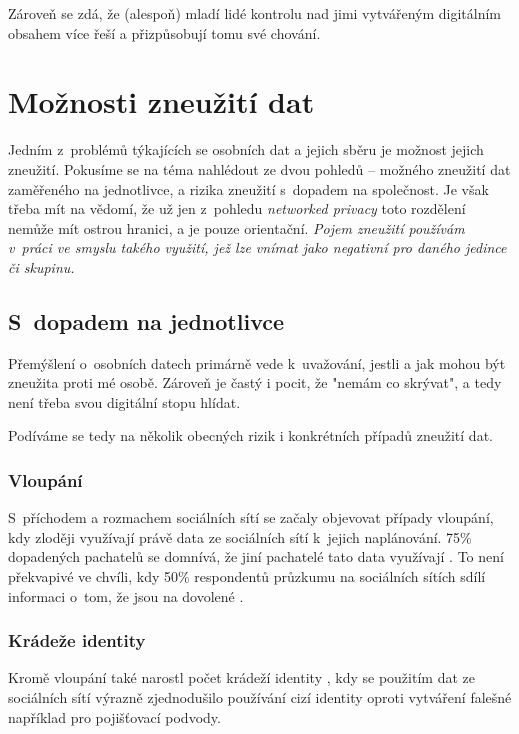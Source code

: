 Zároveň se zdá, že (alespoň) mladí lidé kontrolu nad jimi vytvářeným digitálním obsahem více řeší a přizpůsobují tomu své chování\citep{youth-online-behavior}.

\section{Možnosti zneužití dat}
Jedním z~problémů týkajících se osobních dat a jejich sběru je možnost jejich zneužití. Pokusíme se na téma nahlédout ze dvou pohledů -- možného zneužití dat zaměřeného na jednotlivce, a rizika zneužití s~dopadem na společnost. Je však třeba mít na vědomí, že už jen z~pohledu \textit{networked privacy} toto rozdělení nemůže mít ostrou hranici, a je pouze orientační.
\textit{Pojem zneužití používám v~práci ve smyslu takého využití, jež lze vnímat jako negativní pro daného jedince či skupinu.}

\subsection{S~dopadem na jednotlivce}
Přemýšlení o~osobních datech primárně vede k~uvažování, jestli a jak mohou být zneužita proti mé osobě. Zároveň je častý i pocit, že "nemám co skrývat", a tedy není třeba svou digitální stopu hlídat.

Podíváme se tedy na několik obecných rizik i konkrétních případů zneužití dat.

\subsubsection*{Vloupání}
S~příchodem a rozmachem sociálních sítí se začaly objevovat případy vloupání, kdy zloději využívají právě data ze sociálních sítí k~jejich naplánování. 75\% dopadených pachatelů se domnívá, že jiní pachatelé tato data využívají \citep{burglary}.
To není překvapivé ve chvíli, kdy 50\% respondentů průzkumu na sociálních sítích sdílí informaci o~tom, že jsou na dovolené \citep{burglary}. 

\subsubsection*{Krádeže identity}
Kromě vloupání také narostl počet krádeží identity \citep{identity-theft-rise}, kdy se použitím dat ze sociálních sítí výrazně zjednodušilo používání cizí identity oproti vytváření falešné například pro pojišťovací podvody. 

